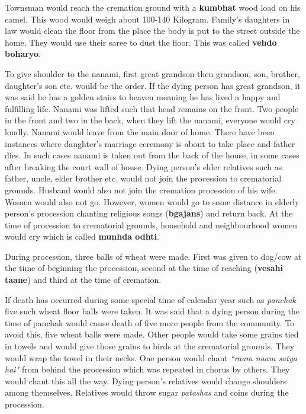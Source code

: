 Townsman would reach the cremation ground with a \textbf{kumbhat} wood load on
his camel. This wood would weigh about 100-140 Kilogram. Family's daughters in
law would clean the floor from the place the body is put to the street outside
the home. They would use their saree to dust the floor. This was called
\textbf{vehdo boharyo}.

To give shoulder to the nanami, first great grandson then grandson, son,
brother, daughter's son etc. would be the order. If the dying person has great
grandson, it was said he has a golden stairs to heaven meaning he has lived a
happy and fulfilling life. Nanami was lifted such that head remains on the
front. Two people in the front and two in the back, when they lift the nanami,
everyone would cry loudly. Nanami would leave from the main door of home. There
have been instances where daughter's marriage ceremony is about to take place
and father dies. In such cases nanami is taken out from the back of the house,
in some cases after breaking the court wall of house. Dying person's elder
relatives such as father, uncle, elder brother etc. would not join the
procession to crematorial grounds. Husband would also not join the cremation
procession of his wife. Women would also not go. However, women would go to
some distance in elderly person's procession chanting religious songs
(\textbf{bgajans}) and return back. At the time of procession to crematorial
grounds, household and neighbourhood women would cry which is called
\textbf{munhda odhti}. 

During procession, three balls of wheat were made. First was given to dog/cow
at the time of beginning the procession, second at the time of reaching
(\textbf{vesahi taane}) and third at the time of cremation.

If death has occurred during some special time of calendar year such as
\textit{panchak} five such wheat floor balls were taken. It was said that a
dying person during the time of panchak would cause death of five more people
from the community. To avoid this, five wheat balls were made. Other people
would take some grains tied in towels and would give those grains to birds at
the crematorial grounds. They would wrap the towel in their necks. One person
would chant \textit{``raam naam satya hai"} from behind the procession which was
repeated in chorus by others. They would chant this all the way. Dying person's
relatives would change shoulders among themselves. Relatives would throw sugar
\textit{patashas} and coins during the procession.

